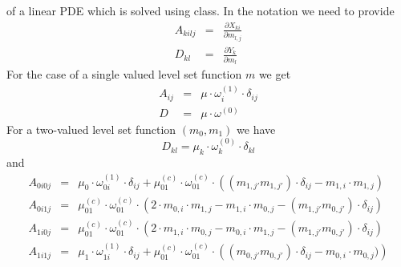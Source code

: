 of a linear PDE which is solved using \escript {} class. In the \escript notation we need to provide 
\begin{equation}\label{ref:EQU:REG:600}
\begin{array}{rcl}
 A_{kilj} & = & \displaystyle{\frac{\partial X_{ki}}{\partial m_{l,j}}} \\
D_{kl} & =  &  \displaystyle{\frac{\partial Y_{k}}{\partial m_{l}}} 
\end{array}
\end{equation} 
For the case of a single valued level set function $m$ we get 
\begin{equation}\label{ref:EQU:REG:601}
\begin{array}{rcl}
 A_{ij} & =&  \mu \cdot \omega^{(1)}_i \cdot \delta_{ij}  \\
D & = &  \mu \cdot \omega^{(0)} 
\end{array}
\end{equation}
For a two-valued level set function $(m_0,m_1)$ we have
\begin{equation}\label{ref:EQU:REG:602}
D_{kl}  =   \mu_k \cdot \omega^{(0)}_k \cdot \delta_{kl} 
\end{equation} 
and 
\begin{equation}\label{ref:EQU:REG:603}
\begin{array}{rcl}
A_{0i0j} & = & \mu_0 \cdot \omega^{(1)}_{0i} \cdot \delta_{ij} + \mu^{(c)}_{01} \cdot \omega^{(c)}_{01} \cdot 
\left( (m_{1,j'}m_{1,j'} )\cdot \delta_{ij}  -  m_{1,i} \cdot m_{1,j} \right)    \\
A_{0i1j} & = & \mu^{(c)}_{01} \cdot \omega^{(c)}_{01} \cdot \left( 2 \cdot m_{0,i} \cdot  m_{1,j}
- m_{1,i} \cdot  m_{0,j} - ( m_{1,j'} m_{0,j'} ) \cdot  \delta_{ij}
\right)  \\
A_{1i0j} & = & \mu^{(c)}_{01} \cdot \omega^{(c)}_{01} \cdot \left( 2 \cdot m_{1,i} \cdot  m_{0,j}
- m_{0,i} \cdot  m_{1,j} - ( m_{1,j'} m_{0,j'} ) \cdot  \delta_{ij} \right)  \\
A_{1i1j} & = &  \mu_1 \cdot \omega^{(1)}_{1i} \cdot \delta_{ij} + \mu^{(c)}_{01} \cdot \omega^{(c)}_{01} \cdot
\left( (m_{0,j'}m_{0,j'} ) \cdot \delta_{ij}  -  m_{0,i} \cdot m_{0,j}  ) \right) 
\end{array}
\end{equation} 


